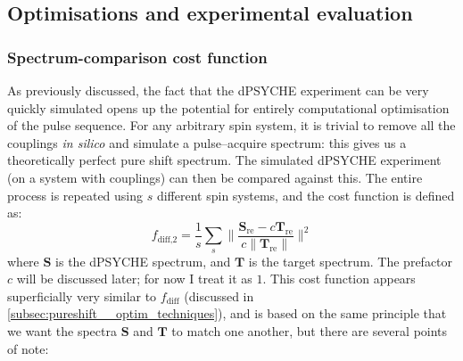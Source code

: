 \subsection{Optimisations and experimental evaluation}
\label{subsec:pureshift__dpsyche_optimisation}


\subsubsection{Spectrum-comparison cost function}

As previously discussed, the fact that the dPSYCHE experiment can be very quickly simulated opens up the potential for entirely computational optimisation of the pulse sequence.
For any arbitrary spin system, it is trivial to remove all the couplings \textit{in silico} and simulate a pulse--acquire spectrum: this gives us a theoretically perfect pure shift spectrum.
The simulated dPSYCHE experiment (on a system with couplings) can then be compared against this.
The entire process is repeated using $s$ different spin systems, and the cost function is defined as:
\begin{equation}
    \label{eq:f_diff_dpsyche}
    f_\text{diff,2} = \frac{1}{s}\sum_s \Biggl\lVert \frac{\symbf{S}_\text{re} - c\symbf{T}_\text{re}}{c\lVert \symbf{T}_\text{re} \rVert} \Biggr\rVert^2
\end{equation}
where $\symbf{S}$ is the dPSYCHE spectrum, and $\symbf{T}$ is the target spectrum.
The prefactor $c$ will be discussed later; for now I treat it as $1$.
This cost function appears superficially very similar to $f_\text{diff}$ (discussed in \cref{subsec:pureshift__optim_techniques}), and is based on the same principle that we want the spectra $\symbf{S}$ and $\symbf{T}$ to match one another, but there are several points of note:
